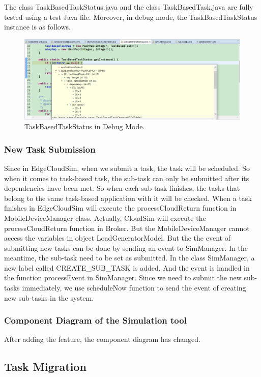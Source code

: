 The class TaskBasedTaskStatus.java and the class TaskBasedTask.java are fully tested using a test Java file. Moreover, in debug mode, the TaskBasedTaskStatus instance is as follows.

\begin{figure}
	\centering
	\includegraphics[width=1\textwidth]{./figures/TaskBasedTaskStatus-1.png}
	\caption{\label{fig:frog}TaskBasedTaskStatus in Debug Mode.}
\end{figure}

\subsubsection{New Task Submission}
Since in EdgeCloudSim, when we submit a task, the task will be scheduled. So when it comes to task-based task, the  sub-task can only be submitted after its dependencies  have been met. So when each sub-task finishes, the tasks that belong to the same task-based application with it will be checked. When a task finishes in EdgeCloudSim will execute the processCloudReturn function in MobileDeviceManager class. Actually, CloudSim will execute the processCloudReturn function in Broker. But the MobileDeviceManager cannot access the variables in object LoadGeneratorModel. But the the event of submitting new tasks can be done by sending  an event to SimManager. In the  meantime, the sub-task need to be set as submitted. In the class SimManager, a new label called CREATE\_SUB\_TASK is added. And the event is handled in the function processEvent in SimManager. Since we need to submit the new sub-tasks immediately, we use scheduleNow function to send the event of creating new sub-tasks in the system.

\subsubsection{Component Diagram of the Simulation tool}
After adding the feature, the component diagram has changed.

\subsection{Task Migration}

